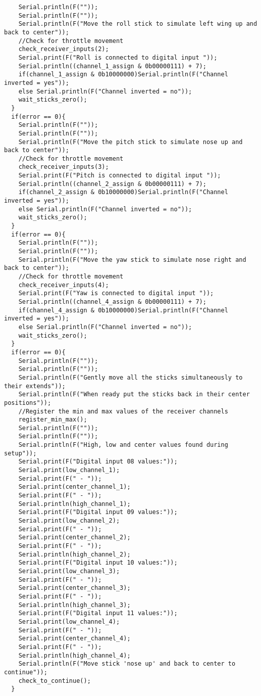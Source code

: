 \begin{lstlisting}
    Serial.println(F(""));
    Serial.println(F(""));
    Serial.println(F("Move the roll stick to simulate left wing up and back to center"));
    //Check for throttle movement
    check_receiver_inputs(2);
    Serial.print(F("Roll is connected to digital input "));
    Serial.println((channel_1_assign & 0b00000111) + 7);
    if(channel_1_assign & 0b10000000)Serial.println(F("Channel inverted = yes"));
    else Serial.println(F("Channel inverted = no"));
    wait_sticks_zero();
  }
  if(error == 0){
    Serial.println(F(""));
    Serial.println(F(""));
    Serial.println(F("Move the pitch stick to simulate nose up and back to center"));
    //Check for throttle movement
    check_receiver_inputs(3);
    Serial.print(F("Pitch is connected to digital input "));
    Serial.println((channel_2_assign & 0b00000111) + 7);
    if(channel_2_assign & 0b10000000)Serial.println(F("Channel inverted = yes"));
    else Serial.println(F("Channel inverted = no"));
    wait_sticks_zero();
  }
  if(error == 0){
    Serial.println(F(""));
    Serial.println(F(""));
    Serial.println(F("Move the yaw stick to simulate nose right and back to center"));
    //Check for throttle movement
    check_receiver_inputs(4);
    Serial.print(F("Yaw is connected to digital input "));
    Serial.println((channel_4_assign & 0b00000111) + 7);
    if(channel_4_assign & 0b10000000)Serial.println(F("Channel inverted = yes"));
    else Serial.println(F("Channel inverted = no"));
    wait_sticks_zero();
  }
  if(error == 0){
    Serial.println(F(""));
    Serial.println(F(""));
    Serial.println(F("Gently move all the sticks simultaneously to their extends"));
    Serial.println(F("When ready put the sticks back in their center positions"));
    //Register the min and max values of the receiver channels
    register_min_max();
    Serial.println(F(""));
    Serial.println(F(""));
    Serial.println(F("High, low and center values found during setup"));
    Serial.print(F("Digital input 08 values:"));
    Serial.print(low_channel_1);
    Serial.print(F(" - "));
    Serial.print(center_channel_1);
    Serial.print(F(" - "));
    Serial.println(high_channel_1);
    Serial.print(F("Digital input 09 values:"));
    Serial.print(low_channel_2);
    Serial.print(F(" - "));
    Serial.print(center_channel_2);
    Serial.print(F(" - "));
    Serial.println(high_channel_2);
    Serial.print(F("Digital input 10 values:"));
    Serial.print(low_channel_3);
    Serial.print(F(" - "));
    Serial.print(center_channel_3);
    Serial.print(F(" - "));
    Serial.println(high_channel_3);
    Serial.print(F("Digital input 11 values:"));
    Serial.print(low_channel_4);
    Serial.print(F(" - "));
    Serial.print(center_channel_4);
    Serial.print(F(" - "));
    Serial.println(high_channel_4);
    Serial.println(F("Move stick 'nose up' and back to center to continue"));
    check_to_continue();
  }
    

\end{lstlisting}
